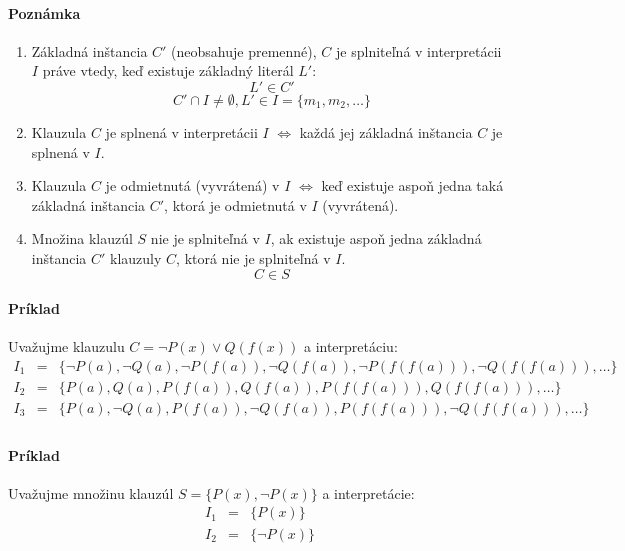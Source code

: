 \paragraph{Poznámka}
\begin{enumerate}
	\item Základná inštancia $C'$ (neobsahuje premenné), $C$ je splniteľná v interpretácii $I$
	práve vtedy, keď existuje základný literál $L'$:
	$$ L' \in C'$$
	$$ C' \cap I \neq \emptyset, L' \in I = \{m_1, m_2, \ldots \} $$

	\item Klauzula $C$ je splnená v interpretácii $I$ $\iff$ každá jej
	základná inštancia $C$ je splnená v $I$.

	\item Klauzula $C$ je odmietnutá (vyvrátená) v $I$ $\iff$ keď existuje
	aspoň jedna taká základná inštancia $C'$, ktorá je odmietnutá v $I$
	(vyvrátená).

	\item Množina klauzúl $S$ nie je splniteľná v $I$, ak existuje aspoň
	jedna základná inštancia $C'$ klauzuly $C$, ktorá nie je splniteľná v
	$I$. $$C \in S$$
\end{enumerate}


\paragraph{Príklad} Uvažujme klauzulu $C=\neg P(x) \lor Q(f(x))$ a
interpretáciu:
$$
\begin{array}{lll}
I_1 &=& \{ \neg P(a), \neg Q(a), \neg P(f(a)), \neg Q(f(a)), \neg P(f(f(a))),
\neg Q(f(f(a))), \ldots \} \\
I_2 &=& \{ P(a), Q(a), P(f(a)), Q(f(a)), P(f(f(a))), Q(f(f(a))), \ldots \} \\
I_3 &=& \{ P(a), \neg Q(a), P(f(a)), \neg Q(f(a)), P(f(f(a))), \neg Q(f(f(a))),
\ldots \} \\
\end{array}
$$

\paragraph{Príklad} Uvažujme množinu klauzúl $S=\{P(x), \neg P(x)\}$ a
interpretácie:
$$
\begin{array}{lll}
I_1 &=& \{ P(x) \} \\
I_2 &=& \{ \neg P(x) \} \\
\end{array}
$$

